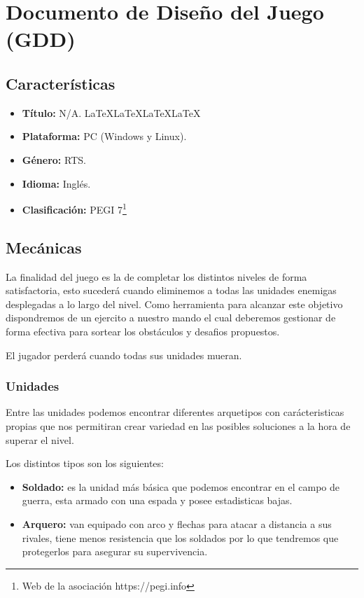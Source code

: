 \chapter{Documento de Diseño del Juego (GDD)}
\section{Características}
\begin{itemize}
	\item \textbf{Título:} N/A. \LaTeX \LaTeX \LaTeX \LaTeX
	\item \textbf{Plataforma:} \ac{PC} (Windows y Linux).
	\item \textbf{Género:} \acf{RTS}.
	\item \textbf{Idioma:} Inglés.
	\item \textbf{Clasificación:} PEGI 7\footnote{Web de la asociación https://pegi.info}
\end{itemize}

\section{Mecánicas}
La finalidad del juego es la de completar los distintos niveles de forma satisfactoria,
esto sucederá cuando eliminemos a todas las unidades enemigas desplegadas a lo largo del
nivel. Como herramienta para alcanzar este objetivo dispondremos de un ejercito a nuestro
mando el cual deberemos gestionar de forma efectiva para sortear los obstáculos y
desafios propuestos.

El jugador perderá cuando todas sus unidades mueran.

\subsection{Unidades}
Entre las unidades podemos encontrar diferentes arquetipos con carácteristicas propias
que nos permitiran crear variedad en las posibles soluciones a la hora de superar el
nivel.

Los distintos tipos son los siguientes:
\begin{itemize}
	\item \textbf{Soldado:} es la unidad más básica que podemos encontrar en el campo de
							guerra, esta armado con una espada y posee estadisticas
							bajas.
	\item \textbf{Arquero:} van equipado con arco y flechas para atacar a distancia a
							sus rivales, tiene menos resistencia que los soldados por
							lo que tendremos que protegerlos para asegurar su
							supervivencia.  
\end{itemize}
